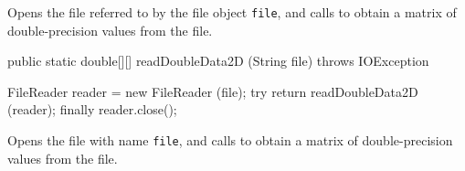 \begin{tabb}   Opens the file referred to by the file object \texttt{file},
 and calls  to
 obtain a matrix of double-precision values from
 the file.
\end{tabb}
\begin{htmlonly}
\end{htmlonly}
\begin{code}

   public static double[][] readDoubleData2D (String file)
                                              throws IOException\begin{hide} {
      FileReader reader = new FileReader (file);
      try {
         return readDoubleData2D (reader);
      }
      finally {
         reader.close();
      }
   }\end{hide}
\end{code}
\begin{tabb}   Opens the file with name \texttt{file},
 and calls  to
 obtain a matrix of double-precision values from
 the file.
\end{tabb}
\begin{htmlonly}
\end{htmlonly}
